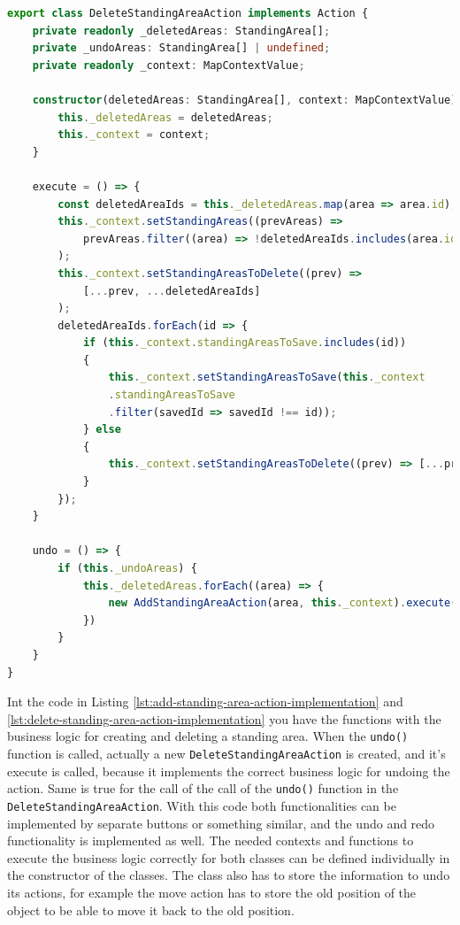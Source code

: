 \begin{lstlisting}[language=TypeScript,caption={Delete standing-area action implementation},label={lst:delete-standing-area-action-implementation}]
export class DeleteStandingAreaAction implements Action {
    private readonly _deletedAreas: StandingArea[];
    private _undoAreas: StandingArea[] | undefined;
    private readonly _context: MapContextValue;

    constructor(deletedAreas: StandingArea[], context: MapContextValue) {
        this._deletedAreas = deletedAreas;
        this._context = context;
    }

    execute = () => {
        const deletedAreaIds = this._deletedAreas.map(area => area.id);
        this._context.setStandingAreas((prevAreas) =>
            prevAreas.filter((area) => !deletedAreaIds.includes(area.id))
        );
        this._context.setStandingAreasToDelete((prev) => 
            [...prev, ...deletedAreaIds]
        );
        deletedAreaIds.forEach(id => {
            if (this._context.standingAreasToSave.includes(id)) 
            {
                this._context.setStandingAreasToSave(this._context
                .standingAreasToSave
                .filter(savedId => savedId !== id));
            } else 
            {
                this._context.setStandingAreasToDelete((prev) => [...prev, id]);
            }
        });
    }

    undo = () => {
        if (this._undoAreas) {
            this._deletedAreas.forEach((area) => {
                new AddStandingAreaAction(area, this._context).execute()
            })
        }
    }
}
\end{lstlisting}

Int the code in Listing \ref{lst:add-standing-area-action-implementation} and \ref{lst:delete-standing-area-action-implementation} you have the functions with the business logic for creating and deleting a standing area. When the \texttt{undo()} function is called, actually a new \texttt{DeleteStandingAreaAction} is created, and it's execute is called, because it implements the correct business logic for undoing the action. Same is true for the call of the call of the \texttt{undo()} function in the \texttt{DeleteStandingAreaAction}. With this code both functionalities can be implemented by separate buttons or something similar, and the undo and redo functionality is implemented as well. The needed contexts and functions to execute the business logic correctly for both classes can be defined individually in the constructor of the classes. The class also has to store the information to undo its actions, for example the move action has to store the old position of the object to be able to move it back to the old position.

